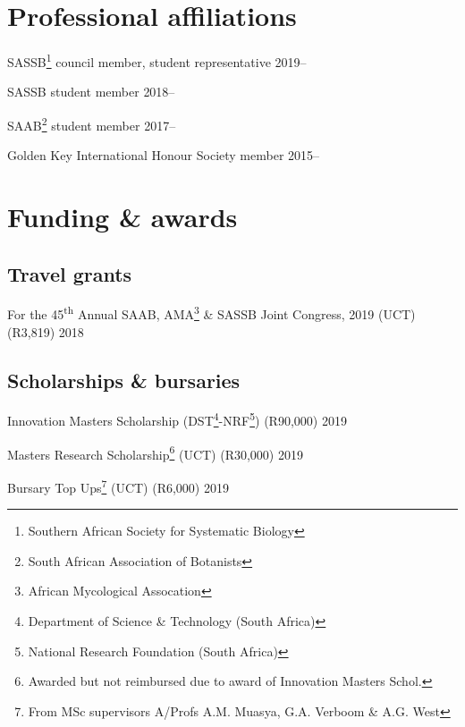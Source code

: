 \documentclass[10pt]{article}
\begin{document}
\section*{Professional affiliations} %

SASSB\footnote{Southern African Society for Systematic Biology} council member, 
student representative                                    \hfill {\small 2019--}

SASSB student member                                      \hfill {\small 2018--}

SAAB\footnote{South African Association of Botanists} student member
                                                          \hfill {\small 2017--}

Golden Key International Honour Society member            \hfill {\small 2015--}

\section*{Funding \& awards} %

\subsection*{Travel grants}

For the 45\textsuperscript{th} Annual SAAB, AMA\footnote{African Mycological Assocation} \& SASSB Joint Congress, 2019 (UCT) (R3,819)    \hfill {\small 2018}

\subsection*{Scholarships \& bursaries}

Innovation Masters Scholarship (DST\footnote{Department of Science \&
Technology (South Africa)}-NRF\footnote{National Research Foundation (South 
Africa)}) (R90,000)                                         \hfill {\small 2019}

Masters Research Scholarship\footnote{Awarded but not reimbursed due to award 
of Innovation Masters Schol.} (UCT) (R30,000)               \hfill {\small 2019}

Bursary Top Ups\footnote{From MSc supervisors A/Profs A.M. Muasya, G.A. Verboom 
\& A.G. West} (UCT) (R6,000)                                \hfill {\small 2019}
\end{document}
